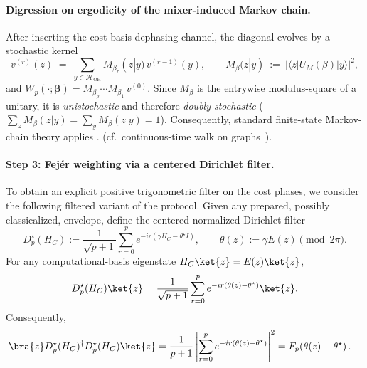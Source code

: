 \documentclass[a4paper,unpublished,onecolumn,11pt]{quantumarticle}
\theoremstyle{definition}
\theoremstyle{remark}
\newcommand{\OH}{\mathcal{H}_{\mathrm{OH}}}
\begin{document}
\paragraph{Digression on ergodicity of the mixer-induced Markov chain.}
After inserting the cost-basis dephasing channel, the diagonal evolves by a
stochastic kernel
\[
  v^{(r)}(z) \;=\; \sum_{y\in\OH} M_{\beta_r}(z|y)\,v^{(r-1)}(y),
  \qquad
  M_{\beta}(z|y)\ :=\ \bigl|\langle z|U_M(\beta)|y\rangle\bigr|^2,
\]
and \(W_p(\cdot;\boldsymbol\beta) = M_{\beta_p}\cdots M_{\beta_1}\,v^{(0)}\).
Since \(M_\beta\) is the entrywise modulus-square of a unitary, it is
\emph{unistochastic} and therefore \emph{doubly stochastic}
(\(\sum_z M_\beta(z|y)=\sum_y M_\beta(z|y)=1\)). Consequently, standard finite-state Markov-chain theory applies
\cite{Seneta2006,LevinPeresWilmer2017}.
(cf.\ continuous-time walk on graphs~\cite{ChildsReview}).




\paragraph{Step 3: Fej\'er weighting via a centered Dirichlet filter.}
To obtain an explicit positive trigonometric filter on the cost phases,
we consider the following filtered variant of the protocol. Given any
prepared, possibly classicalized, envelope, define the centered
normalized Dirichlet filter
\begin{equation}
D_p^\star(H_C)
:=
\frac{1}{\sqrt{p+1}}
\sum_{r=0}^{p}
e^{-ir(\gamma H_C-\theta^\star I)},
\qquad
\theta(z):=\gamma E(z)\pmod{2\pi}.
\label{eq:centered-dirichlet-filter}
\end{equation}
For any computational-basis eigenstate
$H_C\ket{z}=E(z)\ket{z}$,
\begin{equation}
D_p^\star(H_C)\ket{z}
=
\frac{1}{\sqrt{p+1}}
\sum_{r=0}^{p}
e^{-ir(\theta(z)-\theta^\star)}
\ket{z}.
\label{eq:centered-dirichlet-action}
\end{equation}
Consequently,
\begin{equation}
\begin{aligned}
\bra{z}
D_p^\star(H_C)^\dagger
D_p^\star(H_C)
\ket{z}
&=
\frac{1}{p+1}
\left|
\sum_{r=0}^{p}
e^{-ir(\theta(z)-\theta^\star)}
\right|^2                                                   =
F_p\!\left(\theta(z)-\theta^\star\right).
\end{aligned}
\label{eq:centered-fejer-weight}
\end{equation}
\end{document}
